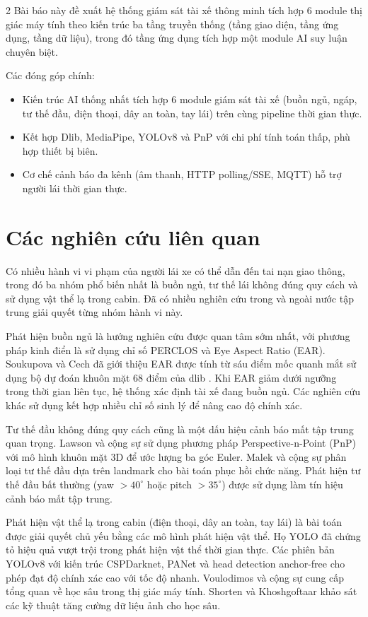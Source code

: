 \documentclass[10pt]{article}
\begin{document}
\begin{multicols}{2}
Bài báo này đề xuất hệ thống giám sát tài xế thông minh tích hợp 6 module thị giác máy tính theo kiến trúc ba tầng truyền thống (tầng giao diện, tầng ứng dụng, tầng dữ liệu), trong đó tầng ứng dụng tích hợp một module AI suy luận chuyên biệt.

Các đóng góp chính:
\begin{itemize}[leftmargin=*,nosep]
  \item Kiến trúc AI thống nhất tích hợp 6 module giám sát tài xế (buồn ngủ, ngáp, tư thế đầu, điện thoại, dây an toàn, tay lái) trên cùng pipeline thời gian thực.
  \item Kết hợp Dlib, MediaPipe, YOLOv8 và PnP với chi phí tính toán thấp, phù hợp thiết bị biên.
  \item Cơ chế cảnh báo đa kênh (âm thanh, HTTP polling/SSE, MQTT) hỗ trợ người lái thời gian thực.
\end{itemize}

\section{Các nghiên cứu liên quan}

Có nhiều hành vi vi phạm của người lái xe có thể dẫn đến tai nạn giao thông, trong đó ba nhóm phổ biến nhất là buồn ngủ, tư thế lái không đúng quy cách và sử dụng vật thể lạ trong cabin. Đã có nhiều nghiên cứu trong và ngoài nước tập trung giải quyết từng nhóm hành vi này.

Phát hiện buồn ngủ là hướng nghiên cứu được quan tâm sớm nhất, với phương pháp kinh điển là sử dụng chỉ số PERCLOS và Eye Aspect Ratio (EAR). Soukupova và Cech \cite{soukupova2016} đã giới thiệu EAR được tính từ sáu điểm mốc quanh mắt sử dụng bộ dự đoán khuôn mặt 68 điểm của dlib \cite{king2009}. Khi EAR giảm dưới ngưỡng trong thời gian liên tục, hệ thống xác định tài xế đang buồn ngủ. Các nghiên cứu khác \cite{ji2002, ngxande2017} sử dụng kết hợp nhiều chỉ số sinh lý để nâng cao độ chính xác.

Tư thế đầu không đúng quy cách cũng là một dấu hiệu cảnh báo mất tập trung quan trọng. Lawson và cộng sự \cite{lawson2020} sử dụng phương pháp Perspective-n-Point (PnP) với mô hình khuôn mặt 3D để ước lượng ba góc Euler. Malek và cộng sự \cite{malek2021} phân loại tư thế đầu dựa trên landmark cho bài toán phục hồi chức năng. Phát hiện tư thế đầu bất thường (yaw $>40^\circ$ hoặc pitch $>35^\circ$) được sử dụng làm tín hiệu cảnh báo mất tập trung.

Phát hiện vật thể lạ trong cabin (điện thoại, dây an toàn, tay lái) là bài toán được giải quyết chủ yếu bằng các mô hình phát hiện vật thể. Họ YOLO \cite{redmon2016} đã chứng tỏ hiệu quả vượt trội trong phát hiện vật thể thời gian thực. Các phiên bản YOLOv8 \cite{jocher2023} với kiến trúc CSPDarknet, PANet và head detection anchor-free cho phép đạt độ chính xác cao với tốc độ nhanh. Voulodimos và cộng sự \cite{voulodimos2018} cung cấp tổng quan về học sâu trong thị giác máy tính. Shorten và Khoshgoftaar \cite{shorten2019} khảo sát các kỹ thuật tăng cường dữ liệu ảnh cho học sâu.


\end{multicols}
\end{document}
